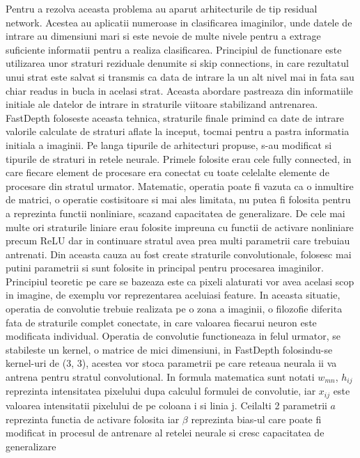 \documentclass[12pt,a4paper]{report}
\begin{document}
Pentru a rezolva aceasta problema au aparut arhitecturile de tip residual network. Acestea au 
aplicatii numeroase in clasificarea imaginilor, unde datele de intrare au dimensiuni mari
si este nevoie de multe nivele pentru a extrage suficiente informatii pentru a realiza 
clasificarea. Principiul de functionare este utilizarea unor straturi reziduale denumite si skip
connections, in care rezultatul unui strat este salvat si transmis ca data de intrare la un alt 
nivel mai in fata sau chiar readus in bucla in acelasi strat. Aceasta abordare pastreaza 
din informatiile initiale ale datelor de intrare in straturile viitoare stabilizand antrenarea. 
FastDepth foloseste aceasta tehnica, straturile finale primind ca date de intrare valorile
calculate de straturi aflate la inceput, tocmai pentru a pastra informatia initiala a imaginii.
Pe langa tipurile de arhitecturi propuse, s-au modificat si tipurile de straturi in retele neurale.
Primele folosite erau cele fully connected, in care fiecare element de procesare era conectat 
cu toate celelalte elemente de procesare din stratul urmator. Matematic, operatia poate fi vazuta 
ca o inmultire de matrici, o operatie costisitoare si mai ales limitata, nu putea fi folosita 
pentru a reprezinta functii nonliniare, scazand capacitatea de generalizare. De cele mai multe ori
straturile liniare erau folosite impreuna cu functii de activare nonliniare precum ReLU dar in 
continuare stratul avea prea multi parametrii care trebuiau antrenati. Din aceasta cauza au fost
create straturile convolutionale, folosesc mai putini parametrii si sunt folosite in principal 
pentru procesarea imaginilor. Principiul teoretic pe care se bazeaza este ca pixeli alaturati vor
avea acelasi scop in imagine, de exemplu vor reprezentarea aceluiasi feature. In aceasta situatie,
operatia de convolutie trebuie realizata pe o zona a imaginii, o filozofie diferita fata de 
straturile complet conectate, in care valoarea fiecarui neuron este modificata individual.  
Operatia de convolutie functioneaza in felul urmator, se stabileste un kernel, o matrice de 
mici dimensiuni, in FastDepth folosindu-se kernel-uri de (3, 3), acestea vor stoca parametrii 
pe care reteaua neurala ii va antrena pentru stratul convolutional. In formula matematica sunt
notati \(w_{mn}\), \(h_{ij}\) reprezinta intensitatea pixelului dupa calculul formulei de convolutie, 
iar \(x_{ij}\) este valoarea intensitatii pixelului de pe coloana i si linia j. Ceilalti 2 
parametrii \(a\) reprezinta functia de activare folosita iar \(\beta\) reprezinta bias-ul care 
poate fi modificat in procesul de antrenare al retelei neurale si cresc capacitatea de generalizare
\end{document}

